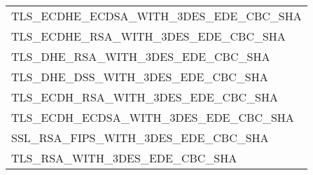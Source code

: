 \documentclass{article}
\begin{document}
\begin{table}[h!]
\begin{tabular}{l}
TLS\_ECDHE\_ECDSA\_WITH\_3DES\_EDE\_CBC\_SHA \\
TLS\_ECDHE\_RSA\_WITH\_3DES\_EDE\_CBC\_SHA   \\
TLS\_DHE\_RSA\_WITH\_3DES\_EDE\_CBC\_SHA     \\
TLS\_DHE\_DSS\_WITH\_3DES\_EDE\_CBC\_SHA     \\
TLS\_ECDH\_RSA\_WITH\_3DES\_EDE\_CBC\_SHA    \\
TLS\_ECDH\_ECDSA\_WITH\_3DES\_EDE\_CBC\_SHA  \\
SSL\_RSA\_FIPS\_WITH\_3DES\_EDE\_CBC\_SHA    \\
TLS\_RSA\_WITH\_3DES\_EDE\_CBC\_SHA         
\end{tabular}
\end{table}
\end{document}

